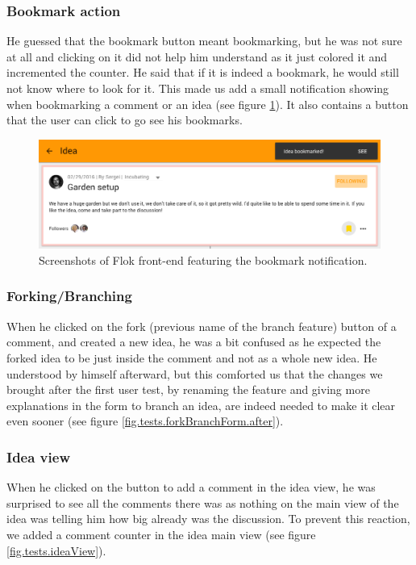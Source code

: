 \documentclass[a4paper,12pt, oneside]{article}
\begin{document}
\subsubsection*{Bookmark action}
He guessed that the bookmark button meant bookmarking, but he was not sure at all and clicking on it did not help him understand as it just colored it and incremented the counter.
He said that if it is indeed a bookmark, he would still not know where to look for it.
This made us add a small notification showing when bookmarking a comment or an idea (see figure \ref{fig.tests.bookmarkNotification}).
It also contains a button that the user can click to go see his bookmarks.

\begin{figure}[!htb]
    \centering
    \includegraphics[width=\textwidth]{images/user_tests/bookmarkNotification.png}
    \caption{Screenshots of Flok front-end featuring the bookmark notification.}
    \label{fig.tests.bookmarkNotification}
\end{figure}

\subsubsection*{Forking/Branching}
When he clicked on the fork (previous name of the branch feature) button of a comment, and created a new idea, he was a bit confused as he expected the forked idea to be just inside the comment and not as a whole new idea.
He understood by himself afterward, but this comforted us that the changes we brought after the first user test, by renaming the feature and giving more explanations in the form to branch an idea, are indeed needed to make it clear even sooner (see figure \ref{fig.tests.forkBranchForm.after}).

\subsubsection*{Idea view}
When he clicked on the button to add a comment in the idea view, he was surprised to see all the comments there was as nothing on the main view of the idea was telling him how big already was the discussion.
To prevent this reaction, we added a comment counter in the idea main view (see figure \ref{fig.tests.ideaView}).
\end{document}
